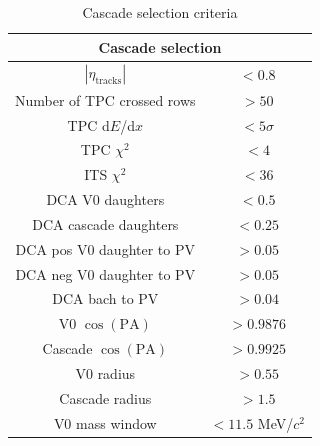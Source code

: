     \begin{table}[ht]
      \centering
      \begin{tabular}{|c|c|}
        \hline
        \multicolumn{2}{|c|}{Cascade selection} \\
        \hline
        $|\eta_\text{tracks}|$ & $< 0.8$ \\
        \hline
        Number of TPC crossed rows & $> 50$ \\
        \hline
        TPC d$E$/d$x$ & $< 5\sigma$ \\
        \hline
        TPC $\chi^2$ & $< 4$ \\
        \hline
        ITS $\chi^2$ & $< 36$ \\
        \hline
        DCA V0 daughters & $< 0.5$ \\
        \hline
        DCA cascade daughters & $< 0.25$ \\
        \hline
        DCA pos V0 daughter to PV & $> 0.05$ \\
        \hline
        DCA neg V0 daughter to PV & $> 0.05$ \\
        \hline
        DCA bach to PV & $> 0.04$ \\
        \hline
        V0 $\cos(\text{PA})$ & $> 0.9876$ \\
        \hline
        Cascade $\cos(\text{PA})$ & $> 0.9925$ \\
        \hline
        V0 radius & $> 0.55$ \\
        \hline
        Cascade radius & $> 1.5$ \\
        \hline
        V0 mass window & $< 11.5$ MeV/$c^2$\\
        \hline
      \end{tabular}
      \caption{Cascade selection criteria}
      \label{tab:cascsel}
    \end{table}

